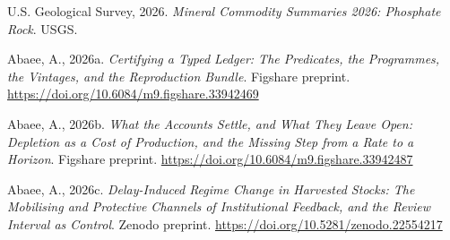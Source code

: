 \documentclass[11pt]{article}
\begin{document}
U.S. Geological Survey, 2026. \emph{Mineral Commodity Summaries 2026: Phosphate Rock}. USGS.

Abaee, A., 2026a. \emph{Certifying a Typed Ledger: The Predicates, the Programmes, the Vintages, and the Reproduction Bundle}. Figshare preprint. \url{https://doi.org/10.6084/m9.figshare.33942469}

Abaee, A., 2026b. \emph{What the Accounts Settle, and What They Leave Open: Depletion as a Cost of Production, and the Missing Step from a Rate to a Horizon}. Figshare preprint. \url{https://doi.org/10.6084/m9.figshare.33942487}

Abaee, A., 2026c. \emph{Delay-Induced Regime Change in Harvested Stocks: The Mobilising and Protective Channels of Institutional Feedback, and the Review Interval as Control}. Zenodo preprint. \url{https://doi.org/10.5281/zenodo.22554217}
\end{document}
